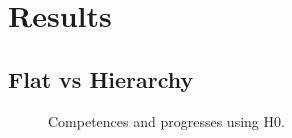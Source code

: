 \documentclass[conference]{include/IEEEtran}
\begin{document}
%


\section{Results}

	\subsection{Flat vs Hierarchy}
	
		\begin{figure}[!t]
			\centering
			\caption{Competences and progresses using H0.}
			\label{resH0}
		\end{figure}
		
\end{document}
